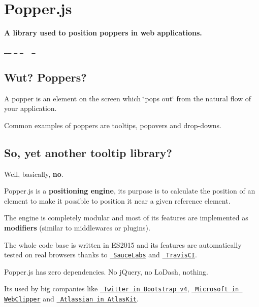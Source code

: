 \section*{Popper.\+js}

{\bfseries{A library used to position poppers in web applications.}} 

\href{https://travis-ci.org/FezVrasta/popper.js/branches}{\texttt{ }}  \href{https://www.bithound.io/github/FezVrasta/popper.js}{\texttt{ }} \href{https://codeclimate.com/github/FezVrasta/popper.js/coverage}{\texttt{ }} \href{https://gitter.im/FezVrasta/popper.js}{\texttt{ }} ~\newline
 \href{https://saucelabs.com/u/popperjs}{\texttt{ }} 



\subsection*{Wut? Poppers?}

A popper is an element on the screen which \char`\"{}pops out\char`\"{} from the natural flow of your application.

Common examples of poppers are tooltips, popovers and drop-\/downs.

\subsection*{So, yet another tooltip library?}

Well, basically, {\bfseries{no}}.

Popper.\+js is a {\bfseries{positioning engine}}, its purpose is to calculate the position of an element to make it possible to position it near a given reference element.

The engine is completely modular and most of its features are implemented as {\bfseries{modifiers}} (similar to middlewares or plugins).

The whole code base is written in E\+S2015 and its features are automatically tested on real browsers thanks to \href{https://saucelabs.com/}{\texttt{ Sauce\+Labs}} and \href{https://travis-ci.org/}{\texttt{ Travis\+CI}}.

Popper.\+js has zero dependencies. No j\+Query, no Lo\+Dash, nothing.

It\textquotesingle{}s used by big companies like \href{https://getbootstrap.com/}{\texttt{ Twitter in Bootstrap v4}}, \href{https://github.com/OneNoteDev/WebClipper}{\texttt{ Microsoft in Web\+Clipper}} and \href{https://aui-cdn.atlassian.com/atlaskit/registry/}{\texttt{ Atlassian in Atlas\+Kit}}.

